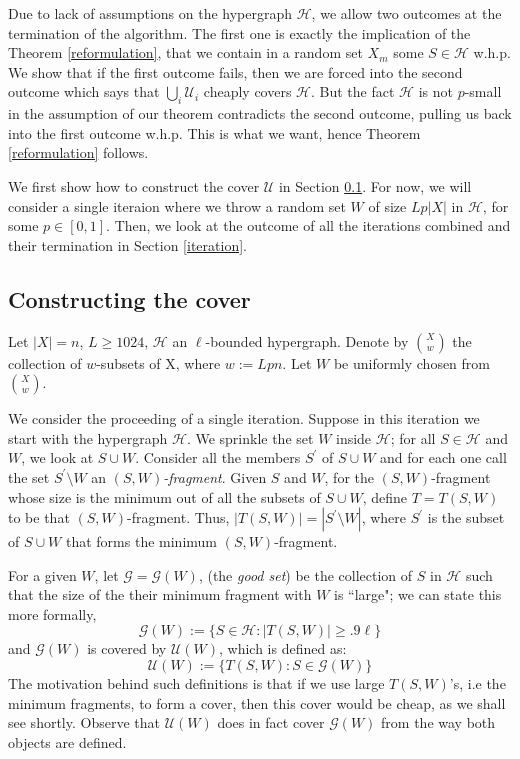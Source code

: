 \documentclass[12pt,oneside,reqno]{amsart}
\theoremstyle{definition}
\numberwithin{equation}{theorem}
\newcommand{\cG}{{\mathcal G}}
\newcommand{\cH}{{\mathcal H}}
\newcommand{\cU}{{\mathcal U}}
\begin{document}
Due to lack of assumptions on the hypergraph $\cH$, we allow two outcomes at the termination of the algorithm. The first one is exactly the implication of the Theorem \ref{reformulation}, that we contain in a random set $X_{ m}$ some $S \in \cH$ w.h.p. We show that if the first outcome fails, then we are forced into the second outcome which says that $\bigcup_{i}\cU_i$ cheaply covers $\cH$. But the fact $\cH$ is not $p$-small in the assumption of our theorem contradicts the second outcome, pulling us back into the first outcome w.h.p. This is what we want, hence Theorem \ref{reformulation} follows. 

We first show how to construct the cover $\cU$ in Section \ref{constructing}. For now, we will consider a single iteraion where we throw a random set $W$ of size $Lp|X|$ in $\cH$, for some $p \in [0,1]$. Then, we look at the outcome of all the iterations combined and their termination in Section \ref{iteration}.

\subsection{Constructing the cover}\label{constructing}
Let $|X| = n $,  $L\geq 1024$, $\cH$ an $\ell$-bounded hypergraph. Denote by $\binom{X}{w}$ the collection of $w$-subsets of X, where $w:=Lpn$. Let $W$ be uniformly chosen from $\binom{X}{w}$.

We consider the proceeding of a single iteration. Suppose in this iteration we start with the hypergraph $\cH$. We sprinkle the set $W$ inside $\cH$; for all $S \in \cH$ and $W$, we look at $S \cup W$. Consider all the members $S^{\prime}$ of $S \cup W$ and for each one call the set $S^{\prime} \setminus W$ an $(S,W)$\emph{-fragment}. Given $S$ and $W$, for the $(S,W)$-fragment whose size is the minimum out of all the subsets of $S \cup W$, define $T = T(S,W)$ to be that $(S,W)$-fragment. Thus, $|T(S,W)| = |S^{\prime} \setminus W|$, where $S^{\prime}$ is the subset of $S \cup W$ that forms the minimum $(S,W)$-fragment. 

For a given $W$, let $\cG = \cG(W)$, (the \emph{good set}) be the collection of $S$ in $\cH$ such that the size of the their minimum fragment with $W$ is ``large"; we can state this more formally, 
\[
\cG(W):=\{S \in \cH: |T(S, W)| \geq .9 \ell\} 
\]
and $\cG(W)$ is covered by $\cU(W)$, which is defined as:
\[
\cU(W):=\{T(S, W): S \in \mathcal{G}(W)\}
\]
The motivation behind such definitions is that if we use large $T(S,W)$'s, i.e the minimum fragments, to form a cover, then this cover would be cheap, as we shall see shortly. Observe that $\cU(W)$ does in fact cover $\cG(W)$ from the way both objects are defined.
\end{document}
